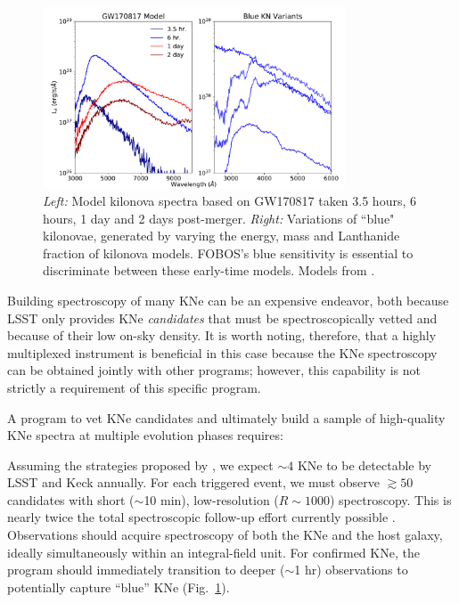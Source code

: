 \documentclass[11pt,a4paper,twoside,onecolumn,openany,final,oldfontcommands]{memoir}
\begin{document}
\begin{figure}
\begin{center}
\includegraphics[width=0.8\textwidth]{figs/kn_fobos.pdf}
\end{center}
\caption[Model spectra of kilonovae]{\textit{Left:} Model kilonova spectra based on GW170817 taken 3.5 hours, 6 hours, 1 day and 2 days post-merger. \textit{Right:} Variations of ``blue" kilonovae, generated by varying the energy, mass and Lanthanide fraction of kilonova models. FOBOS's blue sensitivity is essential to discriminate between these early-time models. Models from \citet{kasen2017}.}
\label{fig:kilonova}    
\end{figure}

Building spectroscopy of many KNe can be an expensive endeavor, both because LSST only provides KNe \textit{candidates} that must be spectroscopically vetted and because of their low on-sky density.  It is worth noting, therefore, that a highly multiplexed instrument is beneficial in this case because the KNe spectroscopy can be obtained jointly with other programs; however, this capability is not strictly a requirement of this specific program.

A program to vet KNe candidates and ultimately build a sample of high-quality KNe spectra at multiple evolution phases requires:

\begin{programrequirement}
\reqitem Assuming the strategies proposed by \citet{margutti2018}, we expect $\sim4$ KNe to be detectable by LSST and Keck annually. For each triggered event, we must observe $\gtrsim50$ candidates with short ($\sim$10 min), low-resolution ($R\sim1000$) spectroscopy.  This is nearly twice the total spectroscopic follow-up effort currently possible \citep{hosseinzadeh2019}.
\reqitem Observations should acquire spectroscopy of both the KNe and the host galaxy, ideally simultaneously within an integral-field unit.
\reqitem For confirmed KNe, the program should immediately transition to deeper ($\sim$1 hr) observations to potentially capture ``blue'' KNe (Fig.~\ref{fig:kilonova}).
\end{programrequirement}
\end{document}
